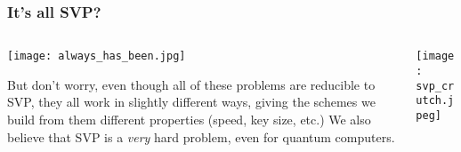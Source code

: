 \documentclass[
aspectratio=169, %
t, %
onlytextwidth, %
10pt, %
]{beamer}
\begin{document}
\begin{frame}
    \frametitle{It's all SVP?}

    \begin{columns}[T] %
        \begin{column}{0.58\linewidth} %
            \texttt{[image: always\_has\_been.jpg]} %

            \vspace{-1.5em}{\tiny\textcolor{ICLBlue}{(Above) Regev discovering the the LWE to $\gamma$-SVP reduction, 2005}}\newline

            \vspace{-2em}But don't worry, even though all of these problems are reducible to SVP, they all work in slightly different ways, giving the schemes we build from them different properties (speed, key size, etc.) We also believe that SVP is a \textit{very} hard problem, even for quantum computers.
        \end{column}
        \begin{column}{0.38\linewidth} %
            \texttt{[image: svp\_crutch.jpeg]} %

            \vspace{-1.5em}{\tiny\textcolor{ICLBlue}{(Above) xkcd Dependency, lattice based cryptography special edition}}
        \end{column}
    \end{columns}
\end{frame}

\end{document}
